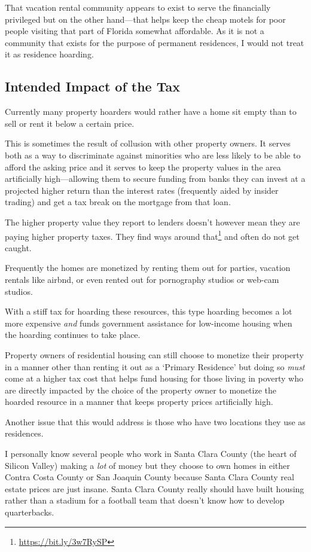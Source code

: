 That vacation rental community appears to exist to serve the financially privileged but on the other hand---that helps keep the cheap motels for poor people visiting that part of Florida somewhat affordable. As it is not a community that exists for the purpose of permanent residences, I would not treat it as residence hoarding.

\subsection{Intended Impact of the Tax}

Currently many property hoarders would rather have a home sit empty than to sell or rent it below a certain price.

This is sometimes the result of collusion with other property owners. It serves both as a way to discriminate against minorities who are less likely to be able to afford the asking price and it serves to keep the property values in the area artificially high---allowing them to secure funding from banks they can invest at a projected higher return than the interest rates (frequently aided by insider trading) and get a tax break on the mortgage from that loan.

The higher property value they report to lenders doesn't however mean they are paying higher property taxes. They find ways around that\footnote{\url{https://bit.ly/3w7RySP}} and often do not get caught.

Frequently the homes are monetized by renting them out for parties, vacation rentals like airbnd\textregistered{}, or even rented out for pornography studios or web-cam studios.

With a stiff tax for hoarding these resources, this type hoarding becomes a lot more expensive \emph{and} funds government assistance for low-income housing when the hoarding continues to take place.

Property owners of residential housing can still choose to monetize their property in a manner other than renting it out as a `Primary Residence' but doing so \emph{must} come at a higher tax cost that helps fund housing for those living in poverty who are directly impacted by the choice of the property owner to monetize the hoarded resource in a manner that keeps property prices artificially high.

Another issue that this would address is those who have two locations they use as residences.

I personally know several people who work in Santa Clara County (the heart of Silicon Valley) making a \emph{lot} of money but they choose to own homes in either Contra Costa County or San Joaquin County because Santa Clara County real estate prices are just insane. Santa Clara County really should have built housing rather than a stadium for a football team that doesn't know how to develop quarterbacks.

